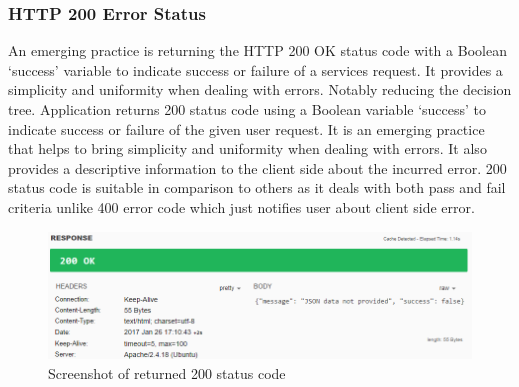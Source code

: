 \subsubsection{HTTP 200 Error Status}
An emerging practice is returning the HTTP 200 OK status code with a Boolean `success' variable to indicate success or failure of a services request. It provides a simplicity and uniformity when dealing with errors. Notably reducing the decision tree. Application returns 200 status code using a Boolean variable `success' to indicate success or failure of the given user request. It is an emerging practice that helps to bring simplicity and uniformity when dealing with errors. It also provides a descriptive information to the client side about the incurred error. 200 status code is suitable in comparison to others as it deals with both pass and fail criteria unlike 400 error code which just notifies user about client side error.
\begin{figure}[H]
    \centering
    \includegraphics{figs/5/200fail}
    \caption{Screenshot of returned 200 status code}
    \label{fig:msa:200fail}
\end{figure}

